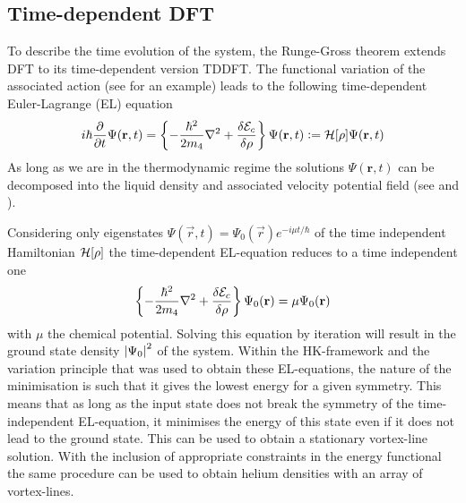 	\subsection{Time-dependent DFT}\label{sec:tddft}
		To describe the time evolution of the system, the Runge-Gross theorem extends DFT to its time-dependent version TDDFT\citep{Run84}. The functional variation of the associated action (see  for an example) leads to the following time-dependent Euler-Lagrange (EL) equation 
	\begin{align}
		i\hbar\frac{\partial}{\partial t} \Psi(\vec{r},t) = \left\{-\frac{\hbar^2}{2m_4}\laplacian + \fdv{\mathcal{E}_c}{\rho}\right\}\Psi(\vec{r},t) \vcentcolon= \mathcal{H}\qty[\rho]\Psi(\vec{r},t) 
		\label{eq:td-el-equation}
	\end{align}
	As long as we are in the thermodynamic regime the solutions $\Psi(\textbf{r},t)$ can be decomposed into the liquid density and associated velocity potential field (see  and ).
	
	Considering only eigenstates $\Psi(\vec{r},t)=\Psi_0(\vec{r})\unit{e}^{-i\mu t/\hbar}$ of the time independent Hamiltonian $\mathcal{H}\qty[\rho]$ the time-dependent EL-equation reduces to a time independent one
	\begin{align}
		\left\{-\frac{\hbar^2}{2m_4} \laplacian + \fdv{\mathcal{E}_c}{\rho}\right\}\Psi_0(\textbf{r}) = \mu\Psi_0(\textbf{r})
		\label{eq:el-equation}
	\end{align}
	with $\mu$ the chemical potential. Solving this equation by iteration will result in the ground state density $\abs{\Psi_0}^2$ of the system. Within the HK-framework and the variation principle that was used to obtain these EL-equations, the nature of the minimisation is such that it gives the lowest energy for a given symmetry. This means that as long as the input state does not break the symmetry of the time-independent EL-equation, it minimises the energy of this state even if it does not lead to the ground state. This can be used to obtain a stationary vortex-line solution. With the inclusion of appropriate constraints in the energy functional the same procedure can be used to obtain helium densities with an array of vortex-lines.

